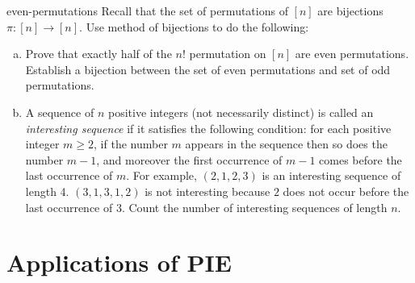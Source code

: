 \begin{exercise-prob}
\begin{show-ps2}{even-permutations}
Recall that the set of permutations of $[n]$ are bijections $\pi : [n] \to [n]$. 
Use method of bijections to do the following:
\begin{enumerate}[(a)]
\item Prove that exactly half of the $n!$ permutation on $[n]$ are even permutations. Establish a bijection between the set of even permutations and set of odd permutations.
\item A sequence of $n$ positive integers (not necessarily distinct) is called an
\textit{interesting sequence} if it satisfies the following condition: for each positive integer $m \ge 2$, if the number $m$ appears in the sequence then so does the number $m-1$, and moreover the first occurrence of $m-1$ comes before the last occurrence of $m$. For example, $(2,1,2,3)$ is an interesting sequence of length 4. $(3,1,3,1,2)$ is not interesting because $2$ does not occur before the last occurrence of $3$. Count the number of interesting sequences of length $n$.
\end{enumerate}
\end{show-ps2}
\end{exercise-prob}

\section{Applications of PIE} \label{sec:Applications of PIE - lec3}
